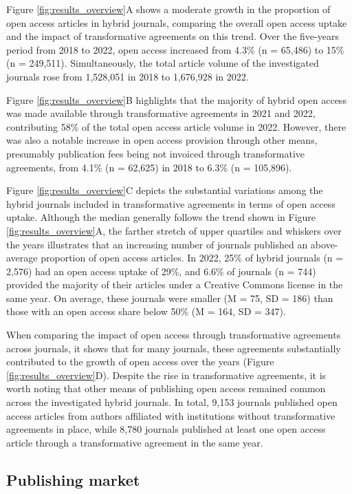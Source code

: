\documentclass[a4paper,man,floatsintext,longtable,noextraspace,12pt]{apa6}
\begin{document}
Figure \ref{fig:results_overview}A shows a moderate growth in the
proportion of open access articles in hybrid journals, comparing the
overall open access uptake and the impact of transformative agreements
on this trend. Over the five-years period from 2018 to 2022, open access
increased from 4.3\% (n = 65,486) to 15\% (n = 249,511). Simultaneously,
the total article volume of the investigated journals rose from
1,528,051 in 2018 to 1,676,928 in 2022.

Figure \ref{fig:results_overview}B highlights that the majority of
hybrid open access was made available through transformative agreements
in 2021 and 2022, contributing 58\% of the total open access article
volume in 2022. However, there was also a notable increase in open
access provision through other means, presumably publication fees being
not invoiced through transformative agreements, from 4.1\% (n = 62,625)
in 2018 to 6.3\% (n = 105,896).

Figure \ref{fig:results_overview}C depicts the substantial variations
among the hybrid journals included in transformative agreements in terms
of open access uptake. Although the median generally follows the trend
shown in Figure \ref{fig:results_overview}A, the farther stretch of
upper quartiles and whiskers over the years illustrates that an
increasing number of journals published an above-average proportion of
open access articles. In 2022, 25\% of hybrid journals (n = 2,576) had
an open access uptake of 29\%, and 6.6\% of journals (n = 744) provided
the majority of their articles under a Creative Commons license in the
same year. On average, these journals were smaller (M = 75, SD = 186)
than those with an open access share below 50\% (M = 164, SD = 347).

When comparing the impact of open access through transformative
agreements across journals, it shows that for many journals, these
agreements substantially contributed to the growth of open access over
the years (Figure \ref{fig:results_overview}D). Despite the rise in
transformative agreements, it is worth noting that other means of
publishing open access remained common across the investigated hybrid
journals. In total, 9,153 journals published open access articles from
authors affiliated with institutions without transformative agreements
in place, while 8,780 journals published at least one open access
article through a transformative agreement in the same year.

\hypertarget{publishing-market}{%
\subsection{Publishing market}\label{publishing-market}}
\end{document}
